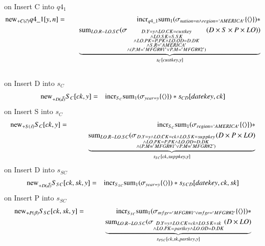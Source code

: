 \\
on Insert C into $q4_1$\
\begin{eqnarray}
\mathrm{new}_{+C(\vec{c})} q4\_1[y,n] &=&  \mathrm{incr}_{q4\_1} \mathrm{sum}_{1} (\sigma_{nation = n \wedge region = `AMERICA'}  \{{\langle\rangle}\}) * \\
\nonumber&&\quad \underbrace{\mathrm{sum}_{LO.R - LO.SC} (\sigma_{\substack{ D.Y = y \wedge  LO.CK = custkey \\\wedge LO.SK = S.SK \\\wedge LO.PK = P.PK \wedge LO.OD = D.DK \\\wedge S.R = 'AMERICA' \\\wedge ( P.M = 'MFGR\#1' \vee P.M = 'MFGR\#2')}} (D \times S \times P \times LO))}_{s_{C}[ custkey, y]}
\end{eqnarray}
\\
on Insert D into $s_C$
\begin{eqnarray}
\mathrm{new}_{+D(\vec{d})} S_{C} [ck, y] &=& \mathrm{incr}_{S_{C}}
\mathrm{sum}_{1} (\sigma_{year = y} \{{\langle\rangle}\}) * s_{CD} [datekey, ck]
\end{eqnarray}
on Insert S into $s_C$
\begin{eqnarray}
\mathrm{new}_{+S(\vec{s})} S_{C} [ck, y] &=& \mathrm{incr}_{S_{C}}
\mathrm{sum}_{1} (\sigma_{region = `AMERICA' } \{{\langle\rangle}\}) * \\
\nonumber&&\qquad \underbrace{\mathrm{sum}_{LO.R - LO.SC} (\sigma_{\substack{ D.Y = y \wedge  LO.CK = ck \wedge LO.SK = suppkey \\\wedge LO.PK = P.PK \wedge LO.OD = D.DK \\\wedge  ( P.M = 'MFGR\#1' \vee P.M = 'MFGR\#2')}} (D \times P \times LO)}_{s_{SC}[ck, suppkey, y]}
\end{eqnarray}
on Insert D into $s_{SC}$
\begin{eqnarray}
\mathrm{new}_{+D(\vec{d})} S_{SC} [ck, sk, y] &=& \mathrm{incr}_{S_{SC}}
\mathrm{sum}_{1} (\sigma_{year = y } \{{\langle\rangle}\}) * s_{SCD} [datekey, ck, sk] 
\end{eqnarray}
on Insert P into $s_{SC}$
\begin{eqnarray}
\mathrm{new}_{+P(\vec{p})} S_{SC} [ck, sk, y] &=& \mathrm{incr}_{S_{SC}}
\mathrm{sum}_{1} (\sigma_{ mfgr = 'MFGR\#1' \vee mfgr = 'MFGR\#2' } \{{\langle\rangle}\}) * \\
\nonumber&&\qquad \underbrace{\mathrm{sum}_{LO.R - LO.SC} (\sigma_{\substack{ D.Y = y \wedge  LO.CK = ck \wedge LO.SK = sk \\\wedge LO.PK = partkey \wedge LO.OD = D.DK }} (D \times LO)}_{s_{PSC}[ck, sk, partkey, y]}
\end{eqnarray}
